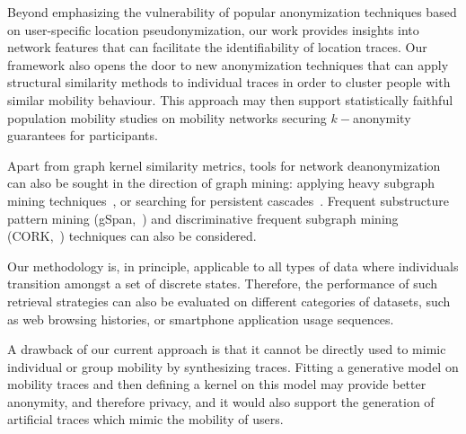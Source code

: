 Beyond emphasizing the vulnerability of popular anonymization techniques based on user-specific location pseudonymization, our work provides insights into network features that can facilitate the identifiability of location traces.
Our framework also opens the door to new anonymization techniques that can apply structural similarity methods to individual traces in order to cluster people with similar mobility behaviour.
This approach may then support statistically faithful population mobility studies on mobility networks securing $k-$anonymity guarantees for participants.

Apart from graph kernel similarity metrics, tools for network deanonymization can also be sought in the direction of graph mining: applying heavy subgraph mining techniques~\citep{Bogdanov2011}, or searching for persistent cascades~\citep{Morse16}.
Frequent substructure pattern mining (gSpan,~\textcite{Yan2002}) and discriminative frequent subgraph mining (CORK,~\textcite{Thoma2010}) techniques can also be considered.

Our methodology is, in principle, applicable to all types of data where individuals transition amongst a set of discrete states.
Therefore, the performance of such retrieval strategies can also be evaluated on different categories of datasets, such as web browsing histories, or smartphone application usage sequences.

A drawback of our current approach is that it cannot be directly used to mimic individual or group mobility by synthesizing traces.
Fitting a generative model on mobility traces and then defining a kernel on this model may provide better anonymity, and therefore privacy, and it would also support the generation of artificial traces which mimic the mobility of users.
